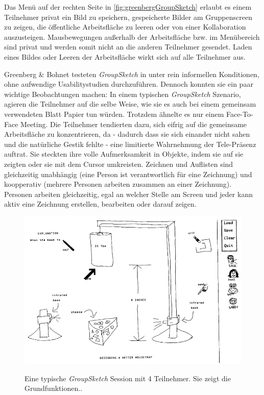 \medskip Das Menü auf der rechten Seite in \autoref{fig:greenbergGroupSketch} erlaubt es einem Teilnehmer privat ein Bild zu speichern, gespeicherte Bilder am Gruppenscreen zu zeigen, die öffentliche Arbeitsfläche zu leeren oder von einer Kollaboration auszusteigen. Mausbewegungen außerhalb der Arbeitsfläche bzw. im Menübereich sind privat und werden somit nicht an die anderen Teilnehmer gesendet. Laden eines Bildes oder Leeren der Arbeitsfläche wirkt sich auf alle Teilnehmer aus.

\medskip Greenberg \& Bohnet testeten \emph{GroupSketch} in \citep{Greenberg:1991} unter rein informellen Konditionen, ohne aufwendige Usabilitystudien durchzuführen. Dennoch konnten sie ein paar wichtige Beobachtungen machen: In einem typischen \emph{GroupSketch} Szenario, agieren die Teilnehmer auf die selbe Weise, wie sie es auch bei einem gemeinsam verwendeten Blatt Papier tun würden. Trotzdem ähnelte es nur einem Face-To-Face Meeting. Die Teilnehmer tendierten dazu, sich eifrig auf die gemeinsame Arbeitsfläche zu konzentrieren, da - dadurch dass sie sich einander nicht sahen und die natürliche Gestik fehlte - eine limitierte Wahrnehmung der Tele-Präsenz auftrat. Sie steckten ihre volle Aufmerksamkeit in Objekte, indem sie auf sie zeigten oder sie mit dem Cursor umkreisten. 
Zeichnen und Auflisten sind gleichzeitig unabhängig (eine Person ist verantwortlich für eine Zeichnung) und koopperativ (mehrere Personen arbeiten zusammen an einer Zeichnung). Personen arbeiten gleichzeitig, egal an welcher Stelle am Screen und jeder kann aktiv eine Zeichnung erstellen, bearbeiten oder darauf zeigen. 

\begin{figure}
        {\includegraphics[width=1\linewidth]{gfx/greenbergGroupSketch}}
		\caption[GroupSketch \newline \citep{Greenberg:1992p83}]{Eine typische \emph{GroupSketch} Session mit 4 Teilnehmer. Sie zeigt die Grundfunktionen..}\label{fig:greenbergGroupSketch}
\end{figure}

